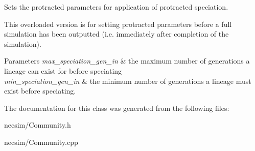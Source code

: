 Sets the protracted parameters for application of protracted speciation. 

This overloaded version is for setting protracted parameters before a full simulation has been outputted (i.\+e. immediately after completion of the simulation).


\begin{DoxyParams}{Parameters}
{\em max\+\_\+speciation\+\_\+gen\+\_\+in} & the maximum number of generations a lineage can exist for before speciating \\
\hline
{\em min\+\_\+speciation\+\_\+gen\+\_\+in} & the minimum number of generations a lineage must exist before speciating. \\
\hline
\end{DoxyParams}


The documentation for this class was generated from the following files\+:\begin{DoxyCompactItemize}
\item 
necsim/Community.\+h\item 
necsim/Community.\+cpp\end{DoxyCompactItemize}
